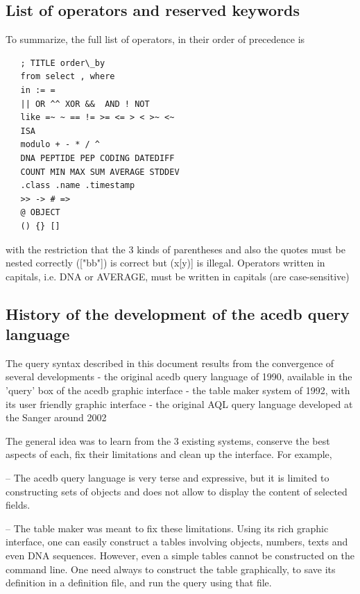 \documentclass[11pt]{article}
\newcommand{\BL}{\begin{lstlisting}}
\begin{document}
\subsection{List of operators and reserved keywords}

To summarize, the full list of operators, in their order of precedence is
\BL
   ; TITLE order\_by
   from select , where
   in := = 
   || OR ^^ XOR &&  AND ! NOT
   like =~ ~ == != >= <= > < >~ <~
   ISA
   modulo + - * / ^
   DNA PEPTIDE PEP CODING DATEDIFF 
   COUNT MIN MAX SUM AVERAGE STDDEV
   .class .name .timestamp
   >> -> # => 
   @ OBJECT
   () {} []
\end{lstlisting}

with the restriction that the 3 kinds of parentheses and 
also the quotes must be nested correctly  (["bb"]) is correct but (x[y)] is illegal. Operators written in capitals, i.e. DNA or AVERAGE, must be written in capitals (are case-sensitive)

\subsection{History of the development of the acedb query language}

The query syntax described in this document results from the convergence of several developments
   - the original acedb query language of 1990, available in the 'query' box of the acedb graphic interface
   - the table maker system of 1992, with its user friendly graphic interface 
   - the original AQL query language developed at the Sanger around 2002

The general idea was to learn from the 3 existing systems, conserve the best aspects of each, fix their limitations and clean up the interface. For example, 

-- The acedb query language is very terse and expressive, but it is limited to constructing sets of objects and does not allow to display the content of selected fields.

-- The table maker was meant to fix these limitations. Using its rich graphic interface, one can easily construct a tables involving objects, numbers, texts and even DNA sequences. However, even a simple tables cannot be constructed on the command line. One need always to construct the table graphically, to save its definition in a definition file, and run the query using that file. 
\end{document}

